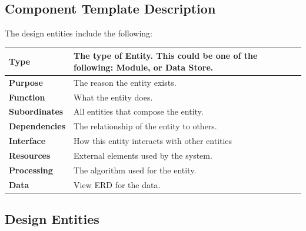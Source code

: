 \documentclass{article}
\begin{document}
\subsection{Component Template Description}

The design entities include the following:

\begin{tabular}{ | l |  p{13.3cm} |}
\hline
\textbf{Type} & The type of Entity. This could be one of the following: Module, or Data Store. \\ \hline
\textbf{Purpose} & The reason the entity exists.  \\ \hline
\textbf{Function} & What the entity does. \\ \hline
\textbf{Subordinates} & All entities that compose the entity. \\ \hline
\textbf{Dependencies} & The relationship of the entity to others. \\ \hline
\textbf{Interface} & How this entity interacts with other entities \\ \hline
\textbf{Resources} & External elements used by the system. \\ \hline
\textbf{Processing} & The algorithm used for the entity. \\ \hline
\textbf{Data} & View ERD for the data. \\ \hline
\end{tabular}

\subsection{Design Entities}
\end{document}
